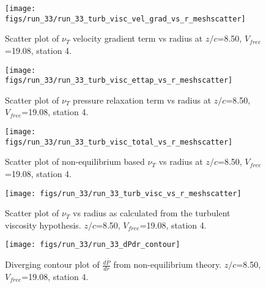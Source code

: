 \begin{figure}[H]
\centering
\texttt{[image: figs/run\_33/run\_33\_turb\_visc\_vel\_grad\_vs\_r\_meshscatter]}
\caption{Scatter plot of $\nu_T$ velocity gradient term vs radius at $z/c$=8.50, $V_{free}$=19.08, station 4.}
\end{figure}


\begin{figure}[H]
\centering
\texttt{[image: figs/run\_33/run\_33\_turb\_visc\_ettap\_vs\_r\_meshscatter]}
\caption{Scatter plot of $\nu_T$ pressure relaxation term vs radius at $z/c$=8.50, $V_{free}$=19.08, station 4.}
\end{figure}


\begin{figure}[H]
\centering
\texttt{[image: figs/run\_33/run\_33\_turb\_visc\_total\_vs\_r\_meshscatter]}
\caption{Scatter plot of non-equilibrium based $\nu_T$ vs radius at $z/c$=8.50, $V_{free}$=19.08, station 4.}
\end{figure}


\begin{figure}[H]
\centering
\texttt{[image: figs/run\_33/run\_33\_turb\_visc\_vs\_r\_meshscatter]}
\caption{Scatter plot of $\nu_T$ vs radius as calculated from the turbulent viscosity hypothesis. $z/c$=8.50, $V_{free}$=19.08, station 4.}
\end{figure}


\begin{figure}[H]
\centering
\texttt{[image: figs/run\_33/run\_33\_dPdr\_contour]}
\caption{Diverging contour plot of $\frac{d\bar{P}}{dr}$ from non-equilibrium theory. $z/c$=8.50, $V_{free}$=19.08, station 4.}
\end{figure}


